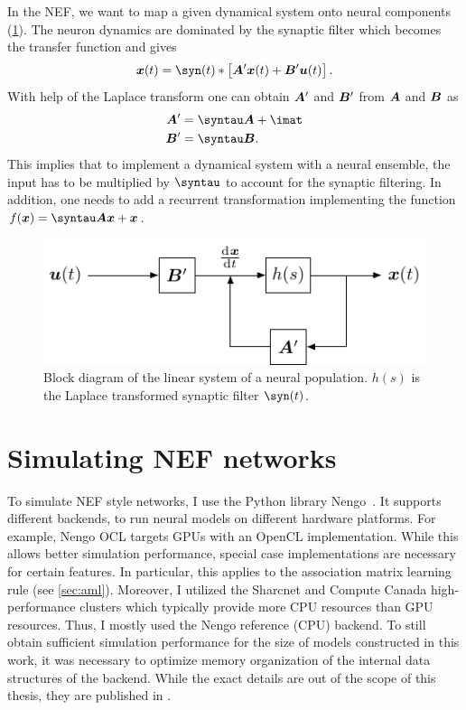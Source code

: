 In the NEF, we want to map a given dynamical system onto neural components (\cref{fig:neural-lti}).
The neuron dynamics are dominated by the synaptic filter \parencite[Appendix~F.1]{eliasmith2003} which becomes the transfer function and gives
\begin{equation}
    \vc x(t) = \syn(t) * \sbr{\mat A' \vc x(t) + \mat B' \vc u(t)} \text{.}
\end{equation}
With help of the Laplace transform one can obtain $\bm{A}'$ and $\bm{B}'$ from $\bm{A}$ and $\bm{B}$ as
\begin{align}
    \mat A' &= \syntau \mat A + \imat \\
    \mat B' &= \syntau \mat B  \text{.}
\end{align}
This implies that to implement a dynamical system with a neural ensemble, the input has to be multiplied by $\syntau$ to account for the synaptic filtering.
In addition, one needs to add a recurrent transformation implementing the function $f(\vc x) = \syntau \mat A \vc x + \vc x$.
\begin{figure}
    \centering
    \includegraphics{tikz/neural-lti}
    \caption[Block diagram of the linear system of a neural population]{Block diagram of the linear system of a neural population. $h(s)$ is the Laplace transformed synaptic filter $\syn(t)$.}\label{fig:neural-lti}
\end{figure}


\section{Simulating NEF networks}
To simulate NEF style networks, I use the Python library Nengo~\parencite{bekolay2014,sharma}.
It supports different backends, to run neural models on different hardware platforms.
For example, Nengo OCL targets GPUs with an OpenCL implementation.
While this allows better simulation performance, special case implementations are necessary for certain features.
In particular, this applies to the association matrix learning rule (see \cref{sec:aml}).
Moreover, I utilized the Sharcnet and Compute Canada high-performance clusters which typically provide more CPU resources than GPU resources.
Thus, I mostly used the Nengo reference (CPU) backend.
To still obtain sufficient simulation performance for the size of models constructed in this work, it was necessary to optimize memory organization of the internal data structures of the backend.
While the exact details are out of the scope of this thesis, they are published in \textcite{gosmann2017}.
